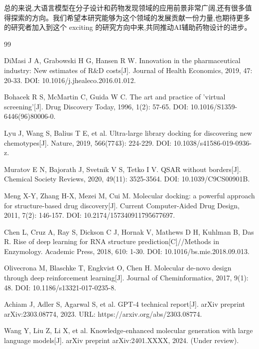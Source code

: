 总的来说,大语言模型在分子设计和药物发现领域的应用前景非常广阔,还有很多值得探索的方向。我们希望本研究能够为这个领域的发展贡献一份力量,也期待更多的研究者加入到这个 exciting 的研究方向中来,共同推动AI辅助药物设计的进步。

\newpage


\begin{thebibliography}{99}

DiMasi J A, Grabowski H G, Hansen R W. Innovation in the pharmaceutical industry: New estimates of R\&D costs[J]. Journal of Health Economics, 2019, 47: 20-33. DOI: 10.1016/j.jhealeco.2016.01.012.

Bohacek R S, McMartin C, Guida W C. The art and practice of 'virtual screening'[J]. Drug Discovery Today, 1996, 1(2): 57-65. DOI: 10.1016/S1359-6446(96)80006-0.

Lyu J, Wang S, Balius T E, et al. Ultra-large library docking for discovering new chemotypes[J]. Nature, 2019, 566(7743): 224-229. DOI: 10.1038/s41586-019-0936-z.

Muratov E N, Bajorath J, Svetnik V S, Tetko I V. QSAR without borders[J]. Chemical Society Reviews, 2020, 49(11): 3525-3564. DOI: 10.1039/C9CS00901B.

Meng X-Y, Zhang H-X, Mezei M, Cui M. Molecular docking: a powerful approach for structure-based drug discovery[J]. Current Computer-Aided Drug Design, 2011, 7(2): 146-157. DOI: 10.2174/157340911795677697.

Chen L, Cruz A, Ray S, Dickson C J, Hornak V, Mathews D H, Kuhlman B, Das R. Rise of deep learning for RNA structure prediction[C]//Methods in Enzymology. Academic Press, 2018, 610: 1-30. DOI: 10.1016/bs.mie.2018.09.013.

Olivecrona M, Blaschke T, Engkvist O, Chen H. Molecular de-novo design through deep reinforcement learning[J]. Journal of Cheminformatics, 2017, 9(1): 48. DOI: 10.1186/s13321-017-0235-8.

Achiam J, Adler S, Agarwal S, et al. GPT-4 technical report[J]. arXiv preprint arXiv:2303.08774, 2023. URL: https://arxiv.org/abs/2303.08774.

Wang Y, Liu Z, Li X, et al. Knowledge-enhanced molecular generation with large language models[J]. arXiv preprint arXiv:2401.XXXX, 2024. (Under review).


\end{thebibliography}
